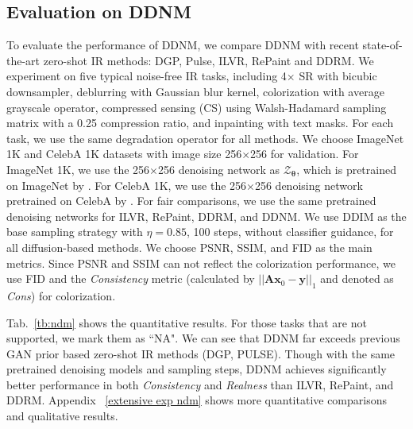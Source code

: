 \documentclass{article} \usepackage{iclr2023_conference,times}
\begin{document}
\subsection{Evaluation on DDNM}
To evaluate the performance of DDNM, we compare DDNM with recent state-of-the-art zero-shot IR methods: DGP\citep{chen2020deep}, Pulse\citep{menon2020pulse}, ILVR\citep{choi2021ilvr}, RePaint\citep{lugmayr2022repaint} and DDRM\citep{kawar2022denoising}. We experiment on five typical noise-free IR tasks, including 4$\times$ SR with bicubic downsampler, deblurring with Gaussian blur kernel, colorization with average grayscale operator, compressed sensing (CS) using Walsh-Hadamard sampling matrix with a 0.25 compression ratio, and inpainting with text masks. For each task, we use the same degradation operator for all methods. We choose ImageNet 1K and CelebA 1K datasets with image size 256$\times$256 for validation. For ImageNet 1K, we use the 256$\times$256 denoising network as $\mathcal{Z}_{\boldsymbol{\theta}}$, which is pretrained on ImageNet by \cite{dhariwal2021diffusion}. For CelebA 1K, we use the 256$\times$256 denoising network pretrained on CelebA by \cite{lugmayr2022repaint}. For fair comparisons, we use the same pretrained denoising networks for ILVR, RePaint, DDRM, and DDNM. We use DDIM as the base sampling strategy with $\eta=0.85$, 100 steps, without classifier guidance, for all diffusion-based methods. We choose PSNR, SSIM, and FID \citep{fid} as the main metrics. Since PSNR and SSIM can not reflect the colorization performance, we use FID and the \textit{Consistency} metric (calculated by $||\mathbf{A}\mathbf{x}_{0}-\mathbf{y}||_{1}$ and denoted as \textit{Cons}) for colorization.


Tab.~\ref{tb:ndm} shows the quantitative results. For those tasks that are not supported, we mark them as ``NA". We can see that DDNM far exceeds previous GAN prior based zero-shot IR methods (DGP, PULSE). Though with the same pretrained denoising models and sampling steps, DDNM achieves significantly better performance in both \textit{Consistency} and \textit{Realness} than ILVR, RePaint, and DDRM. Appendix ~\ref{extensive exp ndm} shows more quantitative comparisons and qualitative results.  
\end{document}
